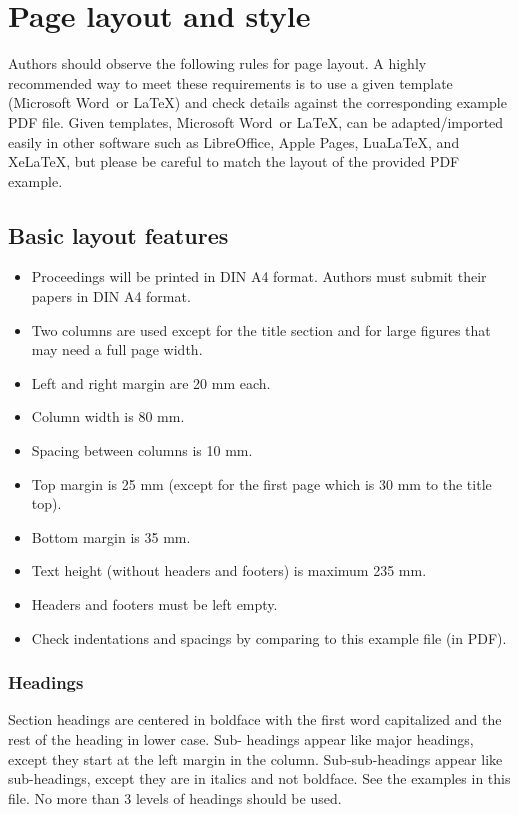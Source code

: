 \documentclass[a4paper]{article}
\begin{document}
\section{Page layout and style}

Authors should observe the following rules for page layout. A highly recommended way to meet these requirements is to use a given template (Microsoft Word\textregistered\ or \LaTeX) and check details against the corresponding example PDF file. Given templates, Microsoft Word\textregistered\ or \LaTeX, can be adapted/imported easily in other software such as LibreOffice, Apple Pages, Lua\LaTeX, and Xe\LaTeX, but please be careful to match the layout of the provided PDF example.

\subsection{Basic layout features}

\begin{itemize}
\item Proceedings will be printed in DIN A4 format. Authors must submit their papers in DIN A4 format.
\item Two columns are used except for the title section and for large figures that may need a full page width.
\item Left and right margin are 20 mm each. 
\item Column width is 80 mm. 
\item Spacing between columns is 10 mm.
\item Top margin is 25 mm (except for the first page which is 30 mm to the title top).
\item Bottom margin is 35 mm.
\item Text height (without headers and footers) is maximum 235 mm.
\item Headers and footers must be left empty.
\item Check indentations and spacings by comparing to this example file (in PDF).
\end{itemize}

\subsubsection{Headings}

Section headings are centered in boldface with the first word capitalized and the rest of the heading in lower case. Sub- headings appear like major headings, except they start at the left margin in the column. Sub-sub-headings appear like sub-headings, except they are in italics and not boldface. See the examples in this file. No more than 3 levels of headings should be used.
\end{document}

